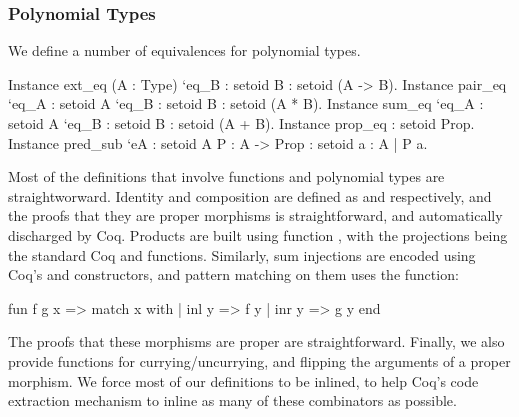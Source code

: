 \documentclass{llncs}
\begin{document}
\subsubsection{Polynomial Types}
We define a number of equivalences for polynomial types.
\begin{coqcode}
Instance ext_eq (A : Type) `{eq_B : setoid B} : setoid (A -> B).
Instance pair_eq `{eq_A : setoid A} `{eq_B : setoid B} : setoid (A * B).
Instance sum_eq `{eq_A : setoid A} `{eq_B : setoid B} : setoid (A + B).
Instance prop_eq : setoid Prop.
Instance pred_sub `{eA : setoid A} {P : A -> Prop} : setoid {a : A | P a}.
\end{coqcode}
Most of the definitions that involve functions and polynomial types are
straightworward.  Identity and composition are defined as 
 and  
respectively, and the proofs that they are proper morphisms is straightforward,
and automatically discharged by Coq. 
Products are built using function ,
with the projections being the standard Coq   and
 functions. Similarly, sum injections are encoded using
Coq's  and  constructors, and
pattern matching on them uses the function:
\begin{coqcode}
fun f g x => match x with | inl y => f y | inr y => g y end
\end{coqcode}
The proofs that these morphisms are proper are straightforward.  Finally, we
also provide functions for currying/uncurrying, and  flipping the arguments of
a proper morphism. We force most of our definitions to be inlined, to help
Coq's code extraction mechanism to inline as many of these combinators as
possible.
\end{document}
